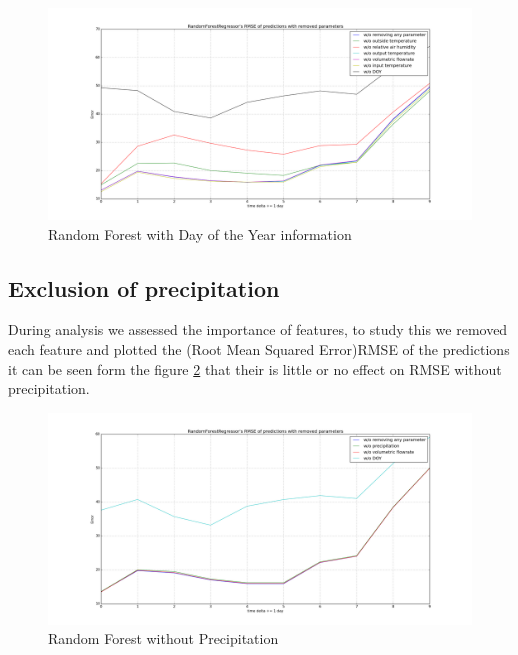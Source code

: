 \documentclass{scrartcl}
\begin{document}
\begin{figure}[H]
  \center
  \includegraphics[width=1\linewidth]{img/RandomForestRegressor_day_error_without_some_params_DOY.png}
  \caption{Random Forest with Day of the Year information}
  \label{fig:RandomForestRegressor_day_error_without_some_params_DOY}
\end{figure}


\subsection{Exclusion of precipitation}	
During analysis we assessed the importance of features, to study this we removed each feature and plotted the (Root Mean Squared Error)RMSE of the predictions it can be seen form the figure \ref{fig:RandomForestRegressor_day_error_without_precipation} that their is little or no effect on RMSE without precipitation.

\begin{figure}[H]
  \center
  \includegraphics[width=1\linewidth]{img/RandomForestRegressor_day_error_without_precipation.png}
  \caption{Random Forest without Precipitation}
  \label{fig:RandomForestRegressor_day_error_without_precipation}
\end{figure}
\end{document}

